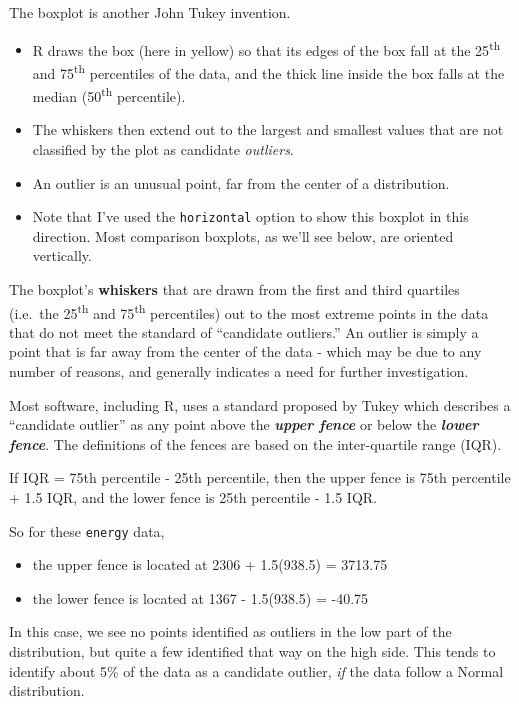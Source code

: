 \documentclass[
]{book}
\providecommand{\tightlist}{%
  \setlength{\itemsep}{0pt}\setlength{\parskip}{0pt}}
\begin{document}
The boxplot is another John Tukey invention.

\begin{itemize}
\tightlist
\item
  R draws the box (here in yellow) so that its edges of the box fall at the 25\textsuperscript{th} and 75\textsuperscript{th} percentiles of the data, and the thick line inside the box falls at the median (50\textsuperscript{th} percentile).
\item
  The whiskers then extend out to the largest and smallest values that are not classified by the plot as candidate \emph{outliers}.
\item
  An outlier is an unusual point, far from the center of a distribution.
\item
  Note that I've used the \texttt{horizontal} option to show this boxplot in this direction. Most comparison boxplots, as we'll see below, are oriented vertically.
\end{itemize}

The boxplot's \textbf{whiskers} that are drawn from the first and third quartiles (i.e.~the 25\textsuperscript{th} and 75\textsuperscript{th} percentiles) out to the most extreme points in the data that do not meet the standard of ``candidate outliers.'' An outlier is simply a point that is far away from the center of the data - which may be due to any number of reasons, and generally indicates a need for further investigation.

Most software, including R, uses a standard proposed by Tukey which describes a ``candidate outlier'' as any point above the \textbf{\emph{upper fence}} or below the \textbf{\emph{lower fence}}. The definitions of the fences are based on the inter-quartile range (IQR).

If IQR = 75th percentile - 25th percentile, then the upper fence is 75th percentile + 1.5 IQR, and the lower fence is 25th percentile - 1.5 IQR.

So for these \texttt{energy} data,

\begin{itemize}
\tightlist
\item
  the upper fence is located at 2306 + 1.5(938.5) = 3713.75
\item
  the lower fence is located at 1367 - 1.5(938.5) = -40.75
\end{itemize}

In this case, we see no points identified as outliers in the low part of the distribution, but quite a few identified that way on the high side. This tends to identify about 5\% of the data as a candidate outlier, \emph{if} the data follow a Normal distribution.
\end{document}

